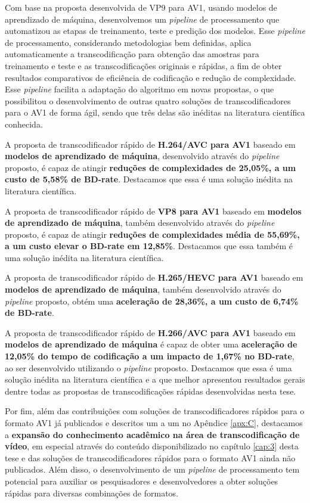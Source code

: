 Com base na proposta desenvolvida de VP9 para AV1, usando modelos de aprendizado de máquina, desenvolvemos um \textit{pipeline} de processamento que automatizou as etapas de treinamento, teste e predição dos modelos. Esse \textit{pipeline} de processamento, considerando metodologias bem definidas, aplica automaticamente a transcodificação para obtenção das amostras para treinamento e teste e as transcodificações originais e rápidas, a fim de obter resultados comparativos de eficiência de codificação e redução de complexidade. Esse \textit{pipeline} facilita a adaptação do algoritmo em novas propostas, o que possibilitou o desenvolvimento de outras quatro soluções de transcodificadores para o AV1 de forma ágil, sendo que três delas são inéditas na literatura científica conhecida.

A proposta de transcodificador rápido de \textbf{H.264/AVC para AV1} baseado em \textbf{modelos de aprendizado de máquina}, desenvolvido através do \textit{pipeline} proposto, é capaz de atingir \textbf{reduções de complexidades de 25,05\%, a um custo de 5,58\% de BD-rate}. Destacamos que essa é uma solução inédita na literatura científica.

A proposta de transcodificador rápido de \textbf{VP8 para AV1} baseado em \textbf{modelos de aprendizado de máquina}, também desenvolvido através do \textit{pipeline} proposto, é capaz de atingir \textbf{reduções de complexidades média de 55,69\%, a um custo elevar o BD-rate em 12,85\%}. Destacamos que essa também é uma solução inédita na literatura científica.

A proposta de transcodificador rápido de \textbf{H.265/HEVC para AV1} baseado em \textbf{modelos de aprendizado de máquina}, também desenvolvido através do \textit{pipeline} proposto, obtém uma \textbf{aceleração de 28,36\%, a um custo de 6,74\% de BD-rate}.

A proposta de transcodificador rápido de \textbf{H.266/AVC para AV1} baseado em \textbf{modelos de aprendizado de máquina} é capaz de obter uma \textbf{aceleração de 12,05\% do tempo de codificação a um impacto de 1,67\% no BD-rate}, ao ser desenvolvido utilizando o \textit{pipeline} proposto. Destacamos que essa é uma solução inédita na literatura científica e a que melhor apresentou resultados gerais dentre todas as propostas de transcodificações rápidas desenvolvidas nesta tese.

Por fim, além das contribuições com soluções de transcodificadores rápidos para o formato AV1 já publicados e descritos um a um no Apêndice \ref{apx:C}, destacamos a \textbf{expansão do conhecimento acadêmico na área de transcodificação de vídeo}, em especial através do conteúdo disponibilizado no capítulo \ref{cap:3} desta tese e das soluções de transcodificadores rápidos para o formato AV1 ainda não publicados. Além disso, o desenvolvimento de um \textit{pipeline} de processamento tem potencial para auxiliar os pesquisadores e desenvolvedores a obter soluções rápidas para diversas combinações de formatos.

